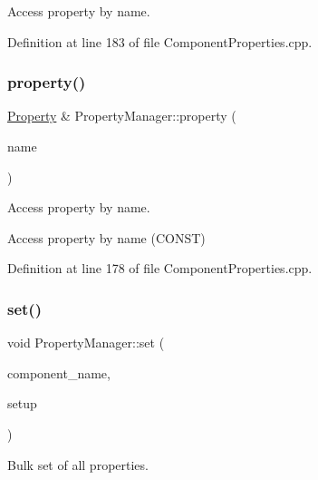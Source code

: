 Access property by name. 

Definition at line 183 of file Component\+Properties.\+cpp.

\hypertarget{class_d_d4hep_1_1_property_manager_aed8bdf063671e03ed7f5ef066e3ea959}{}\label{class_d_d4hep_1_1_property_manager_aed8bdf063671e03ed7f5ef066e3ea959} 
\subsubsection{\texorpdfstring{property()}{property()}\hspace{0.1cm}{\footnotesize\ttfamily [2/2]}}
{\footnotesize\ttfamily \hyperlink{class_d_d4hep_1_1_property}{Property} \& Property\+Manager\+::property (\begin{DoxyParamCaption}\item[{const std\+::string \&}]{name }\end{DoxyParamCaption})}



Access property by name. 

Access property by name (C\+O\+N\+ST) 

Definition at line 178 of file Component\+Properties.\+cpp.

\hypertarget{class_d_d4hep_1_1_property_manager_aa1a25710c88d1c14bbe2c565f0a6957c}{}\label{class_d_d4hep_1_1_property_manager_aa1a25710c88d1c14bbe2c565f0a6957c} 
\subsubsection{\texorpdfstring{set()}{set()}}
{\footnotesize\ttfamily void Property\+Manager\+::set (\begin{DoxyParamCaption}\item[{const std\+::string \&}]{component\+\_\+name,  }\item[{\hyperlink{class_d_d4hep_1_1_property_configurator}{Property\+Configurator} \&}]{setup }\end{DoxyParamCaption})}



Bulk set of all properties. 



